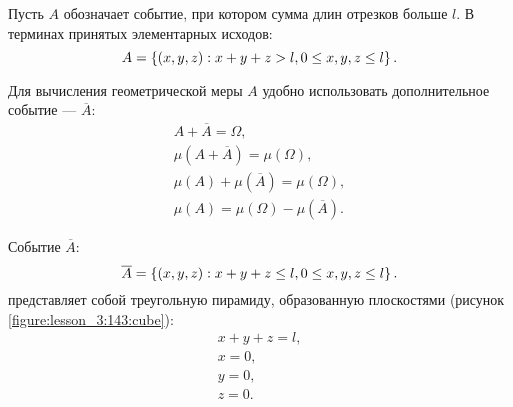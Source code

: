 Пусть $A$ обозначает событие, при котором сумма длин отрезков больше $l$. В терминах принятых элементарных исходов:
\begin{equation}
    A = \left \{ (x,y,z) : x + y + z > l, 0 \le x, y, z \le l \right \}.
\end{equation}

Для вычисления геометрической меры $A$ удобно использовать дополнительное событие --- $\overline{A}$:
\begin{gather}
    A + \overline{A} = \Omega , \\
    \mu \left ( A + \overline{A} \right ) = \mu \left ( \Omega \right ), \\
    \mu \left ( A \right ) + \mu \left ( \overline{A} \right ) = \mu \left ( \Omega \right ), \\
    \mu \left ( A \right ) = \mu \left ( \Omega \right ) - \mu \left ( \overline{A} \right ) .
\end{gather}

Событие $\overline{A}$:
\begin{equation}
    \overline{A} = \left \{ (x,y,z): x + y + z \le l, 0 \le x, y, z \le l \right \} .
\end{equation}
представляет собой треугольную пирамиду, образованную плоскостями (рисунок \ref{figure:lesson_3:143:cube}):
\begin{gather}
    x + y + z = l, \\
    x = 0, \\
    y = 0, \\
    z = 0 .
\end{gather}

